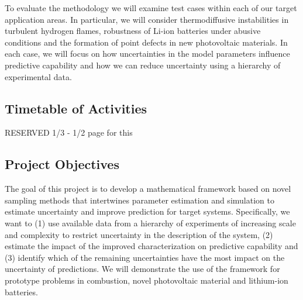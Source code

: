 \documentclass[11pt]{article}
\begin{document}
To evaluate the methodology we will examine test cases within each of our target application areas.  In particular,
we will consider thermodiffusive instabilities in turbulent hydrogen flames, robustness of Li-ion batteries under abusive conditions
and the formation of point defects in new photovoltaic materials.  In each case, we will focus on how uncertainties in the 
model parameters influence predictive capability and how we can reduce uncertainty using a hierarchy of experimental data.


\subsection*{Timetable of Activities}

RESERVED 1/3 - 1/2 page for this

\subsection*{Project Objectives}

The goal of this project is to develop a mathematical framework  
based on novel sampling methods that
intertwines parameter estimation and simulation 
to estimate uncertainty and improve prediction for target systems.
Specifically, we want to
(1) use available data from a hierarchy
of experiments of increasing scale and complexity to restrict
uncertainty in the description of the system, (2) estimate the impact of the improved characterization
on predictive capability and (3) identify which of the remaining uncertainties have the most impact
on the uncertainty of predictions.
We will demonstrate the use of the framework for prototype problems in combustion,
novel photovoltaic material and lithium-ion batteries.




 
\end{document}
